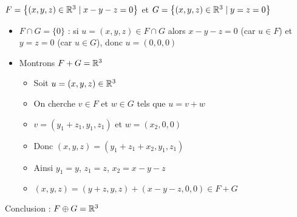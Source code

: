 \begin{frame}
\begin{exemple}
\begin{minipage}{0.6\textwidth}
$F=\big\{ (x,y,z) \in \mathbb{R}^3\mid x-y-z=0\big\}$ et  
$G=\big\{(x,y,z) \in \mathbb{R}^3 \mid y=z=0\big\}$  
\end{minipage}
\begin{minipage}{0.39\textwidth}
\end{minipage}




\pause


\begin{itemize}
  \item $F\cap G=\{0\}$ \pause
  :  si $u=(x,y,z) \in F \cap G$ 
alors  $x-y-z=0$ (car $u \in F$) et  $y=z=0$ (car $u \in G$), donc  $u=(0,0,0)$

\pause
  \item Montrons $F+G=\mathbb{R}^3$
\pause  
  \begin{itemize}
    \item Soit $u=(x,y,z) \in \mathbb{R}^3$
    \pause
    \item On cherche $v \in F$ et $w \in G$ tels que $u=v+w$
    \pause
    \item $v=(y_1+z_1, y_1, z_1)$ et $w=(x_2,0,0)$
    \pause
    \item Donc $(x,y,z)= (y_1+z_1+x_2,y_1,z_1)$
    \pause
    \item Ainsi $y_1=y$, $z_1=z$, $x_2=x-y-z$
    \pause
    \item $(x,y,z)=(y+z,y,z)+ (x-y-z, 0,0) \in F + G$
  \end{itemize}
\pause
\end{itemize}
Conclusion : $F \oplus G=\mathbb{R}^3$
\end{exemple}
\end{frame}


